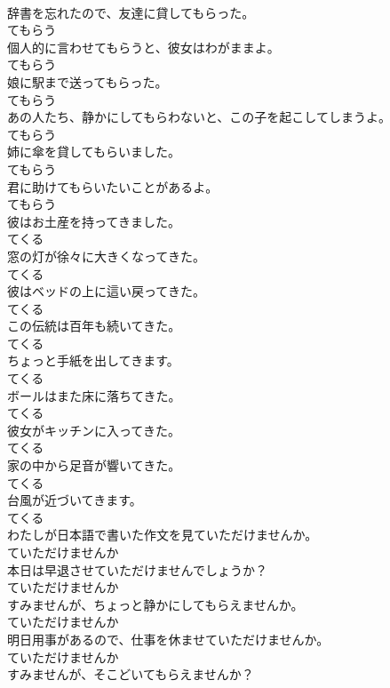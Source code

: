 \documentclass[8pt]{extreport}
\begin{document}
\begin{CJK}{UTF8}{min}
\\	辞書を忘れたので、友達に貸してもらった。	
\\	てもらう
\\	個人的に言わせてもらうと、彼女はわがままよ。	
\\	てもらう
\\	娘に駅まで送ってもらった。	
\\	てもらう
\\	あの人たち、静かにしてもらわないと、この子を起こしてしまうよ。	
\\	てもらう
\\	姉に傘を貸してもらいました。	
\\	てもらう
\\	君に助けてもらいたいことがあるよ。	
\\	てもらう
\\	彼はお土産を持ってきました。	
\\	てくる
\\	窓の灯が徐々に大きくなってきた。	
\\	てくる
\\	彼はベッドの上に這い戻ってきた。	
\\	てくる
\\	この伝統は百年も続いてきた。	
\\	てくる
\\	ちょっと手紙を出してきます。	
\\	てくる
\\	ボールはまた床に落ちてきた。	
\\	てくる
\\	彼女がキッチンに入ってきた。	
\\	てくる
\\	家の中から足音が響いてきた。	
\\	てくる
\\	台風が近づいてきます。	
\\	てくる
\\	わたしが日本語で書いた作文を見ていただけませんか。	
\\	ていただけませんか
\\	本日は早退させていただけませんでしょうか？	
\\	ていただけませんか
\\	すみませんが、ちょっと静かにしてもらえませんか。	
\\	ていただけませんか
\\	明日用事があるので、仕事を休ませていただけませんか。	
\\	ていただけませんか
\\	すみませんが、そこどいてもらえませんか？	

\end{CJK}
\end{document}
